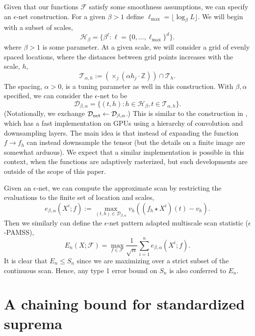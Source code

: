 Given that our functions $\mathcal F$ satisfy some smoothness assumptions, we can specify an $\epsilon$-net construction.
For a given $\beta > 1$ define $\ell_{\max} = \lfloor \log_\beta L \rfloor$.
We will begin with a subset of scales,
$$
\mathcal H_\beta = \{ \beta^\ell : \ell = \{0,\ldots, \ell_{\max}\}^d \}.
$$
where $\beta > 1$ is some parameter.
At a given scale, we will consider a grid of evenly spaced locations, where the distances between grid points increases with the scale, $h$,
$$
\mathcal T_{\alpha,h} := \left( \times_j (\alpha h_j \cdot \mathbb Z) \right) \cap \mathcal T_h.
$$
The spacing, $\alpha > 0$, is a tuning parameter as well in this construction.
With $\beta, \alpha$ specified, we can consider the $\epsilon$-net to be
$$
\mathcal D_{\beta,\alpha} = \{ (t,h) : h \in \mathcal H_\beta, t \in \mathcal T_{\alpha,h} \}.
$$
(Notationally, we exchange $\mathcal D_{\rm net} \gets \mathcal D_{\beta,\alpha}$.)
This is similar to the construction in \cite{sharpnack2016exact}, which has a fast implementation on GPUs using a hierarchy of convolution and downsampling layers.
The main idea is that instead of expanding the function $f \rightarrow f_h$ can instead downsample the tensor (but the details on a finite image are somewhat arduous).
We expect that a similar implementation is possible in this context, when the functions are adaptively rasterized, but such developments are outside of the scope of this paper.

Given an $\epsilon$-net, we can compute the approximate scan by restricting the evaluations to the finite set of location and scales,
$$
e_{\beta,\alpha}(X^i; f) := \max_{(t,h) \in \mathcal D_{\beta,\alpha}} v_h \left( (f_h \star X^i) (t) - v_h \right).
$$
Then we similarly can define the $\epsilon$-net pattern adapted multiscale scan statistic ($\epsilon$-PAMSS),
$$
E_{n}(X; \mathcal F) = \max_{f \in \mathcal F} \frac{1}{\sqrt n} \sum_{i=1}^n e_{\beta,\alpha}(X^i; f).
$$
It is clear that $E_n \le S_n$ since we are maximizing over a strict subset of the continuous scan.
Hence, any type 1 error bound on $S_n$ is also conferred to $E_n$.

\section{A chaining bound for standardized suprema}
\label{sec:chaining}

